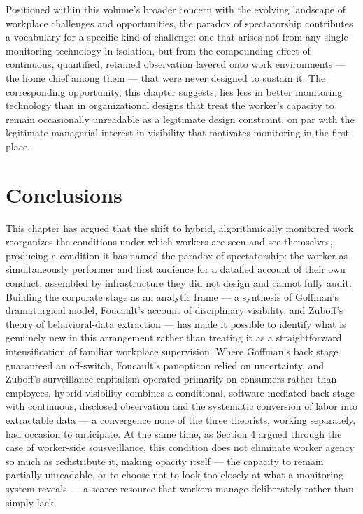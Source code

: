 \documentclass[10pt]{article}
\begin{document}
Positioned within this volume's broader concern with the evolving landscape of workplace challenges and opportunities, the paradox of spectatorship contributes a vocabulary for a specific kind of challenge: one that arises not from any single monitoring technology in isolation, but from the compounding effect of continuous, quantified, retained observation layered onto work environments --- the home chief among them --- that were never designed to sustain it. The corresponding opportunity, this chapter suggests, lies less in better monitoring technology than in organizational designs that treat the worker's capacity to remain occasionally unreadable as a legitimate design constraint, on par with the legitimate managerial interest in visibility that motivates monitoring in the first place.

\section{Conclusions}

This chapter has argued that the shift to hybrid, algorithmically monitored work reorganizes the conditions under which workers are seen and see themselves, producing a condition it has named the paradox of spectatorship: the worker as simultaneously performer and first audience for a datafied account of their own conduct, assembled by infrastructure they did not design and cannot fully audit. Building the corporate stage as an analytic frame --- a synthesis of Goffman's dramaturgical model, Foucault's account of disciplinary visibility, and Zuboff's theory of behavioral-data extraction --- has made it possible to identify what is genuinely new in this arrangement rather than treating it as a straightforward intensification of familiar workplace supervision. Where Goffman's back stage guaranteed an off-switch, Foucault's panopticon relied on uncertainty, and Zuboff's surveillance capitalism operated primarily on consumers rather than employees, hybrid visibility combines a conditional, software-mediated back stage with continuous, disclosed observation and the systematic conversion of labor into extractable data --- a convergence none of the three theorists, working separately, had occasion to anticipate. At the same time, as Section 4 argued through the case of worker-side sousveillance, this condition does not eliminate worker agency so much as redistribute it, making opacity itself --- the capacity to remain partially unreadable, or to choose not to look too closely at what a monitoring system reveals --- a scarce resource that workers manage deliberately rather than simply lack.
\end{document}
